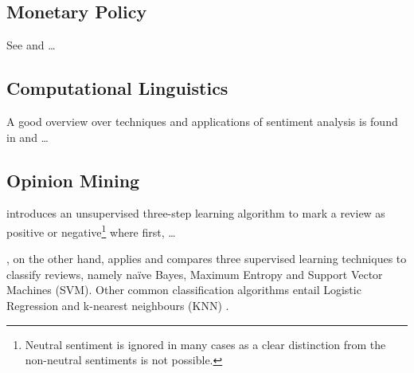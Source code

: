 
\subsection{Monetary Policy}

See \textcite{Mishkin.2007} and \textcite{Cecchetti.2006} \dots

\subsection{Computational Linguistics}

A good overview over techniques and applications of sentiment analysis is found in \textcite{Feldman.2013} and \textcite{Liu.2012} \dots


\subsection{Opinion Mining}

\textcite{Turney.2002} introduces an unsupervised three-step learning algorithm to mark a review as positive or negative\footnote{Neutral sentiment is ignored in many cases as a clear distinction from the non-neutral sentiments is not possible.} where first, \dots


\textcite{Pang.2002}, on the other hand, applies and compares three supervised learning techniques to classify reviews, namely na\"{i}ve Bayes, Maximum Entropy and Support Vector Machines (SVM). Other common classification algorithms entail Logistic Regression and k-nearest neighbours (KNN) \parencite{Feldman.2013}.


